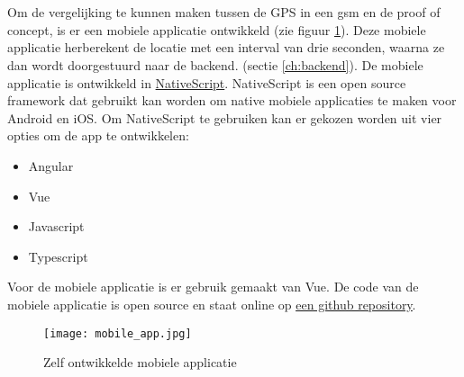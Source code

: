 \section{}
\label{ch:mobileapp}
Om de vergelijking te kunnen maken tussen de GPS in een gsm en de proof of concept, is er een mobiele applicatie ontwikkeld (zie figuur \ref{fig:mobileapp}). Deze mobiele applicatie herberekent de locatie met een interval van drie seconden, waarna ze dan wordt doorgestuurd naar de backend. (sectie \ref{ch:backend}). De mobiele applicatie is ontwikkeld in \href{https://www.nativescript.org/}{NativeScript}. NativeScript is een open source framework dat gebruikt kan worden om native mobiele applicaties te maken voor Android en iOS. Om NativeScript te gebruiken kan er gekozen worden uit vier opties om de app te ontwikkelen:
\begin{itemize}
	\item Angular
	\item Vue
	\item Javascript
	\item Typescript
\end{itemize}
Voor de mobiele applicatie is er gebruik gemaakt van Vue. De code van de mobiele applicatie is open source en staat online op \underline{\href{https://github.com/IndyVC/bap-gsmtracker}{een github repository}}. 
\begin{figure}
	\texttt{[image: mobile\_app.jpg]}
	\caption{Zelf ontwikkelde mobiele applicatie}
	\label{fig:mobileapp}
\end{figure}